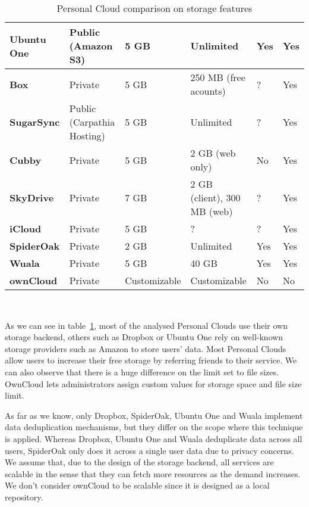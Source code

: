 {\begin{table}
\begin{center}
\begin{tabular}{ | p{3.4cm} | p{2.0cm} | p{2.6cm} | p{2.6cm} | p{1.0cm} | p{1.0cm} | }
	\textbf{Ubuntu One} &
	Public (Amazon S3) &
	5 GB &
	Unlimited &
	Yes &
	Yes \\ \hline
	
	\textbf{Box} &
	Private &
	5 GB & 
	250 MB (free acounts) &
	? &
	Yes \\ \hline
	
	\textbf{SugarSync} & 
	Public (Carpathia Hosting) &
	5 GB &
	Unlimited &
	? &
	Yes \\ \hline
	
	\textbf{Cubby} &
	Private &
	5 GB &
	2 GB (web only) &
	No &
	Yes \\ \hline
	
	\textbf{SkyDrive} & 
	Private &
	7 GB &
	2 GB (client), 300 MB (web) &
	? &
	Yes \\ \hline

	\textbf{iCloud} &
	Private &
	5 GB &
	? &
	? &
	Yes \\ \hline
	
	\textbf{SpiderOak} & 
	Private &
	2 GB &
	Unlimited &
	Yes &
	Yes \\ \hline

	\textbf{Wuala} &
	Private &
	5 GB &
	40 GB &
	Yes &
	Yes \\ \hline
	
	\textbf{ownCloud} &
	Private &
	Customizable &
	Customizable &
	No &
	No \\ \hline

    \end{tabular}
    \\[10pt]
    \caption{Personal Cloud comparison on storage features}
    \label{tab:pc_storage}
\end{center}
\end{table}

As we can see in table~\ref{tab:pc_storage}, most of the analysed Personal Clouds use their own storage backend, others such as Dropbox or Ubuntu One rely on well-known storage providers such as Amazon to store users' data. Most Personal Clouds allow users to increase their free storage by referring friends to their service. We can also observe that there is a huge difference on the limit set to file sizes. OwnCloud lets administrators assign custom values for storage space and file size limit.

As far as we know, only Dropbox, SpiderOak, Ubuntu One and Wuala implement data deduplication mechanisms, but they differ on the scope where this technique is applied. Whereas Dropbox, Ubuntu One and Wuala deduplicate data across all users, SpiderOak only does it across a single user data due to privacy concerns. We assume that, due to the design of the storage backend, all services are scalable in the sense that they can fetch more resources as the demand increases. We don't consider ownCloud to be scalable since it is designed as a local repository.

}
